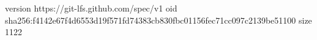 version https://git-lfs.github.com/spec/v1
oid sha256:f4142e67f4d6553d19f571fd74383cb830fbc01156fec71cc097c2139be51100
size 1122
